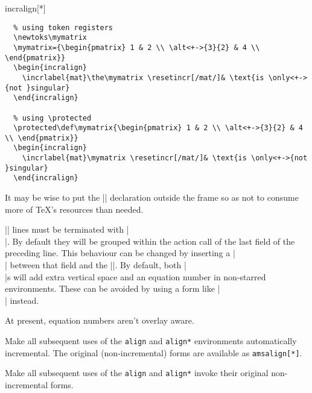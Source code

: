 \documentclass[a4paper]{ltxdoc}
\begin{document}
\begin{environment}{{incralign[*]}}
    \example
\begin{verbatim}
  % using token registers
  \newtoks\mymatrix
  \mymatrix={\begin{pmatrix} 1 & 2 \\ \alt<+->{3}{2} & 4 \\ \end{pmatrix}}
  \begin{incralign}
    \incrlabel{mat}\the\mymatrix \resetincr[/mat/]& \text{is \only<+->{not }singular}
  \end{incralign}

  % using \protected
  \protected\def\mymatrix{\begin{pmatrix} 1 & 2 \\ \alt<+->{3}{2} & 4 \\ \end{pmatrix}}
  \begin{incralign}
    \incrlabel{mat}\mymatrix \resetincr[/mat/]& \text{is \only<+->{not }singular}
  \end{incralign}

\end{verbatim}
    It may be wise to put the |\newtoks| declaration outside the frame so as not
    to consume more of \TeX's resources than needed.  

    |\intertext| lines must be terminated with |\\|.  By default they will be
    grouped within the action call of the last field of the preceding line.
    This behaviour can be changed by inserting a |\\| between that field and the
    |\intertext|.  By default, both |\\|s will add extra vertical space and an
    equation number in non-starred environments.  These can be avoided by using
    a form like |\nonumber\\[-3ex]| instead.

    At present, equation numbers aren't overlay aware.
\end{environment}



\begin{command}{\makealignincremental}
  Make all subsequent uses of the \texttt{align} and \texttt{align*}
  environments automatically incremental.  The original (non-incremental) forms
  are available as \texttt{amsalign[*]}.
\end{command}

\begin{command}{\makealignams}
  Make all subsequent uses of the \texttt{align} and \texttt{align*} invoke
  their original non-incremental forms.  
\end{command}
\end{document}
